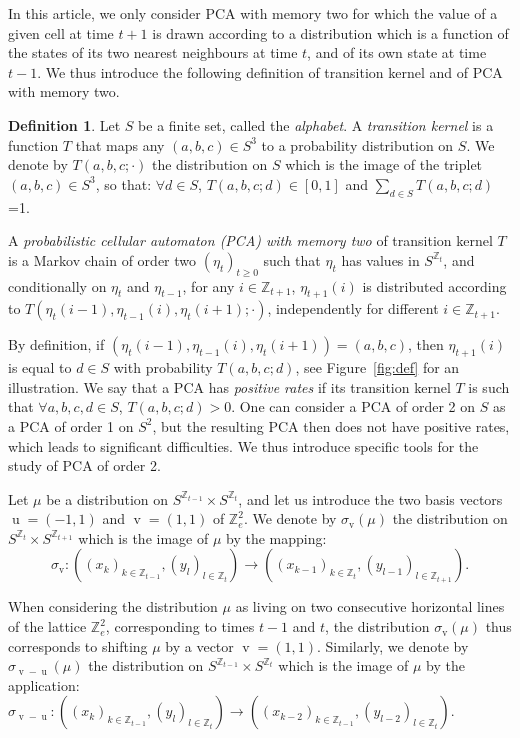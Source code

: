 \documentclass[10pt]{amsart}
\theoremstyle{definition}\newtheorem{defi}[theo]{Definition}\newtheorem{rema}[theo]{Remark}\newtheorem{exam}[theo]{Example}\newtheorem{exem}[theo]{Example}\newtheorem{nota}[theo]{Notation}
\newcounter{a}
\newcommand{\Z}{\mathbb{Z}}
\DeclareMathOperator{\vu}{u}
\DeclareMathOperator{\vv}{v}
\let\oldforall\forall
\renewcommand*{\forall}{\mathrel{\oldforall}}
\newtheorem{definition}[theo]{Definition}
\begin{document}
In this article, we only consider PCA with memory two for which the value of a given cell at time $t+1$ is drawn according to a distribution which is a function of the states of its two nearest neighbours at time $t$, and of its own state at time $t-1$. We thus introduce the following definition of transition kernel and of PCA with memory two.

\begin{definition}
Let $S$ be a finite set, called the \emph{alphabet}. A \emph{transition kernel} is a function $T$ that maps any $(a,b,c)\in S^3$ to a probability distribution on $S$. We denote by $T(a,b,c;\cdot)$ the distribution on $S$ which is the image of the triplet $(a,b,c)\in S^3$, so that: $\forall d\in S$, $T(a,b,c;d)\in [0,1]$ and $\sum_{d \in S} T(a,b,c;d)$=1.

A \emph{probabilistic cellular automaton (PCA) with memory two} of transition kernel $T$ is a Markov chain of order two $(\eta_t)_{t\geq 0}$ such that $\eta_t$ has values in $S^{\Z_t}$, and conditionally on $\eta_t$ and $\eta_{t-1}$, for any $i \in \Z_{t+1}$, $\eta_{t+1}(i)$ is distributed according to $T(\eta_t(i-1),\eta_{t-1}(i),\eta_{t}(i+1);\cdot)$, independently for different $i \in\Z_{t+1}$.
\end{definition}

By definition, if $(\eta_t(i-1),\eta_{t-1}(i),\eta_{t}(i+1))=(a,b,c)$, then $\eta_{t+1}(i)$ is equal to $d\in S$ with probability $T(a,b,c;d)$, see Figure~\ref{fig:def} for an illustration. We say that a PCA has \emph{positive rates} if its transition kernel $T$ is such that $\forall a,b,c,d\in S$, $T(a,b,c;d)>0$. One can consider a PCA of order 2 on $S$ as a PCA of order 1 on $S^2$, but the resulting PCA then does not have positive rates, which leads to significant difficulties. We thus introduce specific tools for the study of PCA of order 2.

Let $\mu$ be a distribution on $S^{\Z_{t-1}}\times S^{\Z_{t}}$, and let us introduce the two basis vectors $\vu=(-1,1)$ and $\vv=(1,1)$ of $\Z_{e}^2$. We denote by $\sigma_{\vv}(\mu)$ the distribution on $S^{\Z_{t}}\times S^{\Z_{t+1}}$ which is the image of $\mu$ by the mapping:
\[
\sigma_{\vv}: \left((x_k)_{k\in \Z_{t-1}},(y_l)_{l\in \Z_{t}}\right) \rightarrow \left((x_{k-1})_{k\in \Z_{t}},(y_{l-1})_{l\in \Z_{t+1}}\right).
\]

When considering the distribution $\mu$ as living on two consecutive horizontal lines of the lattice $\Z_{e}^2$, corresponding to times $t-1$ and $t$, the distribution $\sigma_{\vv}(\mu)$ thus corresponds to shifting $\mu$ by a vector $\vv=(1,1)$. Similarly, we denote by $\sigma_{\vv-\vu}(\mu)$ the distribution on $S^{\Z_{t-1}}\times S^{\Z_{t}}$ which is the image of $\mu$ by the application: $\sigma_{\vv-\vu}:\left((x_k)_{k\in \Z_{t-1}},(y_l)_{l\in \Z_{t}}\right) \rightarrow \left((x_{k-2})_{k\in \Z_{t-1}},(y_{l-2})_{l\in \Z_{t}}\right).$
\end{document}
